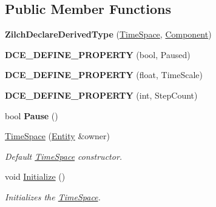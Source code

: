 \subsection*{Public Member Functions}
\begin{DoxyCompactItemize}
\item 
\hypertarget{classDCEngine_1_1Components_1_1TimeSpace_a6a1deebafbae496dd82df74c65b9e9b5}{{\bfseries Zilch\-Declare\-Derived\-Type} (\hyperlink{classDCEngine_1_1Components_1_1TimeSpace}{Time\-Space}, \hyperlink{classDCEngine_1_1Component}{Component})}\label{classDCEngine_1_1Components_1_1TimeSpace_a6a1deebafbae496dd82df74c65b9e9b5}

\item 
\hypertarget{classDCEngine_1_1Components_1_1TimeSpace_ab5c5843add1c5c83fce747d45bb02ce2}{{\bfseries D\-C\-E\-\_\-\-D\-E\-F\-I\-N\-E\-\_\-\-P\-R\-O\-P\-E\-R\-T\-Y} (bool, Paused)}\label{classDCEngine_1_1Components_1_1TimeSpace_ab5c5843add1c5c83fce747d45bb02ce2}

\item 
\hypertarget{classDCEngine_1_1Components_1_1TimeSpace_a58b97dc1272fd01e9d8dc91cb02ff1b9}{{\bfseries D\-C\-E\-\_\-\-D\-E\-F\-I\-N\-E\-\_\-\-P\-R\-O\-P\-E\-R\-T\-Y} (float, Time\-Scale)}\label{classDCEngine_1_1Components_1_1TimeSpace_a58b97dc1272fd01e9d8dc91cb02ff1b9}

\item 
\hypertarget{classDCEngine_1_1Components_1_1TimeSpace_a47737736ea4826593578656466939f16}{{\bfseries D\-C\-E\-\_\-\-D\-E\-F\-I\-N\-E\-\_\-\-P\-R\-O\-P\-E\-R\-T\-Y} (int, Step\-Count)}\label{classDCEngine_1_1Components_1_1TimeSpace_a47737736ea4826593578656466939f16}

\item 
\hypertarget{classDCEngine_1_1Components_1_1TimeSpace_a9671325d60f19a6df5408074a227ae48}{bool {\bfseries Pause} ()}\label{classDCEngine_1_1Components_1_1TimeSpace_a9671325d60f19a6df5408074a227ae48}

\item 
\hyperlink{classDCEngine_1_1Components_1_1TimeSpace_ac402f0cdb5693759b6bb1258488eef0f}{Time\-Space} (\hyperlink{classDCEngine_1_1Entity}{Entity} \&owner)
\begin{DoxyCompactList}\small\item\em Default \hyperlink{classDCEngine_1_1Components_1_1TimeSpace}{Time\-Space} constructor. \end{DoxyCompactList}\item 
\hypertarget{classDCEngine_1_1Components_1_1TimeSpace_a6866afd889055545c5a6f19e8d2bb6cf}{void \hyperlink{classDCEngine_1_1Components_1_1TimeSpace_a6866afd889055545c5a6f19e8d2bb6cf}{Initialize} ()}\label{classDCEngine_1_1Components_1_1TimeSpace_a6866afd889055545c5a6f19e8d2bb6cf}

\begin{DoxyCompactList}\small\item\em Initializes the \hyperlink{classDCEngine_1_1Components_1_1TimeSpace}{Time\-Space}. \end{DoxyCompactList}\end{DoxyCompactItemize}
